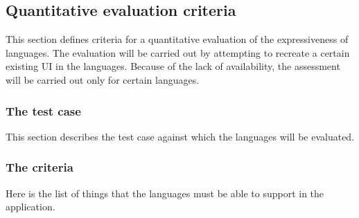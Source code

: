 \subsection{Quantitative evaluation criteria}\label{subsec:quantitative-evaluation-criteria}

This section defines criteria for a quantitative evaluation of the expressiveness of languages.
The evaluation will be carried out by attempting to recreate a certain existing UI in the languages.
Because of the lack of availability, the assessment will be carried out only for certain languages.

\subsubsection{The test case}
This section describes the test case against which the languages will be evaluated.

\subsubsection{The criteria}

Here is the list of things that the languages must be able to support in the application.

